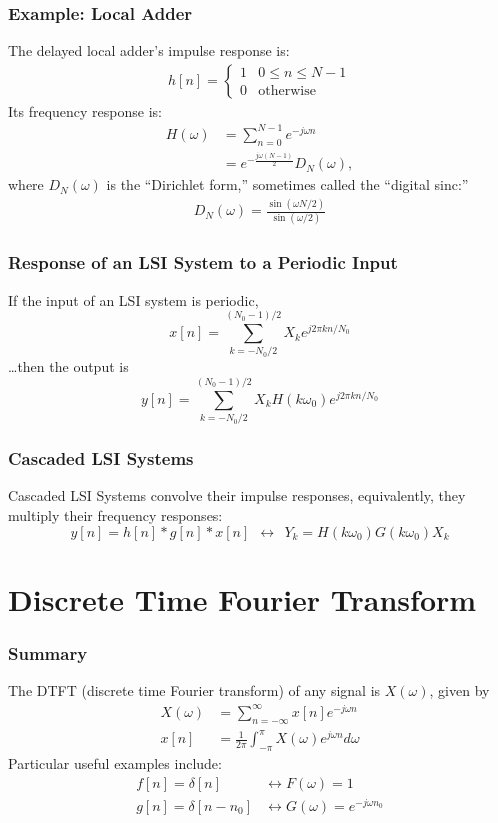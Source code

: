 \documentclass{beamer}
\begin{document}
\begin{frame}
  \frametitle{Example: Local Adder}

  The delayed local adder's impulse response is:
  \begin{align*}
    h[n] = \begin{cases}1 & 0\le n\le N-1\\0&\mbox{otherwise}\end{cases}
  \end{align*}
  Its frequency response is:
  \begin{align*}
    H(\omega) &= \sum_{n=0}^{N-1} e^{-j\omega n}\\
    &= e^{-\frac{j\omega (N-1)}{2}} D_N(\omega),
  \end{align*}
  where $D_N(\omega)$ is the ``Dirichlet form,'' sometimes called the
  ``digital sinc:''
  \begin{align*}
    D_N(\omega) = \frac{\sin(\omega N/2)}{\sin(\omega/2)}
  \end{align*}
\end{frame}

\begin{frame}
  \frametitle{Response of an LSI System to a Periodic Input}
  If the input of an LSI system is periodic,
  \[
  x[n] =\sum_{k=-N_0/2}^{(N_0-1)/2} X_k e^{j2\pi kn/N_0}
  \]
  \ldots then the output is
  \[
  y[n] = \sum_{k=-N_0/2}^{(N_0-1)/2} X_k H(k\omega_0) e^{j2\pi kn/N_0}
  \]
\end{frame}

\begin{frame}
  \frametitle{Cascaded LSI Systems}

  Cascaded LSI Systems convolve their impulse responses, equivalently, they
  multiply their frequency responses:
  \[
  y[n]=h[n]\ast g[n]\ast x[n]~~\leftrightarrow~~Y_k=H(k\omega_0)G(k\omega_0)X_k
  \]
\end{frame}




\section[DTFT]{Discrete Time Fourier Transform}
\setcounter{subsection}{1}


\begin{frame}
  \frametitle{Summary}

  The DTFT (discrete time Fourier transform) of any signal is
  $X(\omega)$, given by
  \begin{align*}
    X(\omega) &= \sum_{n=-\infty}^\infty x[n]e^{-j\omega n}\\
    x[n] &= \frac{1}{2\pi}\int_{-\pi}^\pi X(\omega)e^{j\omega n}d\omega
  \end{align*}
  Particular useful examples include:
  \begin{align*}
    f[n]=\delta[n] &\leftrightarrow F(\omega)=1\\
    g[n]=\delta[n-n_0] &\leftrightarrow G(\omega)=e^{-j\omega n_0}
  \end{align*}
\end{frame}
\end{document}
